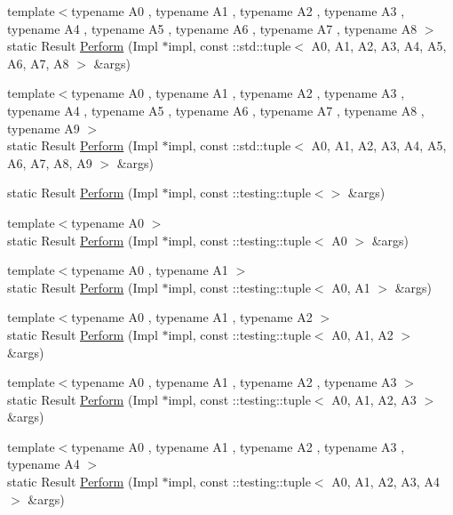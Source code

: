 \begin{DoxyCompactItemize}
\item 
{\footnotesize template$<$typename A0 , typename A1 , typename A2 , typename A3 , typename A4 , typename A5 , typename A6 , typename A7 , typename A8 $>$ }\\static Result \mbox{\hyperlink{classtesting_1_1internal_1_1_action_helper_a4ef8d66e853868f2b29ce6cd7ed84ee1}{Perform}} (Impl $\ast$impl, const \+::std\+::tuple$<$ A0, A1, A2, A3, A4, A5, A6, A7, A8 $>$ \&args)
\item 
{\footnotesize template$<$typename A0 , typename A1 , typename A2 , typename A3 , typename A4 , typename A5 , typename A6 , typename A7 , typename A8 , typename A9 $>$ }\\static Result \mbox{\hyperlink{classtesting_1_1internal_1_1_action_helper_af746a8fa9d26f9eb72a7ea34e939c866}{Perform}} (Impl $\ast$impl, const \+::std\+::tuple$<$ A0, A1, A2, A3, A4, A5, A6, A7, A8, A9 $>$ \&args)
\item 
static Result \mbox{\hyperlink{classtesting_1_1internal_1_1_action_helper_a25176836b0a381d883d61c3a2dc60662}{Perform}} (Impl $\ast$impl, const \+::testing\+::tuple$<$$>$ \&args)
\item 
{\footnotesize template$<$typename A0 $>$ }\\static Result \mbox{\hyperlink{classtesting_1_1internal_1_1_action_helper_a08d2e199b0a3a1f9e05982cae07db3ec}{Perform}} (Impl $\ast$impl, const \+::testing\+::tuple$<$ A0 $>$ \&args)
\item 
{\footnotesize template$<$typename A0 , typename A1 $>$ }\\static Result \mbox{\hyperlink{classtesting_1_1internal_1_1_action_helper_a96d8d8399ff3322e77ba1de51c166f4e}{Perform}} (Impl $\ast$impl, const \+::testing\+::tuple$<$ A0, A1 $>$ \&args)
\item 
{\footnotesize template$<$typename A0 , typename A1 , typename A2 $>$ }\\static Result \mbox{\hyperlink{classtesting_1_1internal_1_1_action_helper_ad450478d185cbcac0e1383f7517f5c36}{Perform}} (Impl $\ast$impl, const \+::testing\+::tuple$<$ A0, A1, A2 $>$ \&args)
\item 
{\footnotesize template$<$typename A0 , typename A1 , typename A2 , typename A3 $>$ }\\static Result \mbox{\hyperlink{classtesting_1_1internal_1_1_action_helper_a2ceda08aeb7b9fd1ad6ccb0821a3ea39}{Perform}} (Impl $\ast$impl, const \+::testing\+::tuple$<$ A0, A1, A2, A3 $>$ \&args)
\item 
{\footnotesize template$<$typename A0 , typename A1 , typename A2 , typename A3 , typename A4 $>$ }\\static Result \mbox{\hyperlink{classtesting_1_1internal_1_1_action_helper_afd2d1dcea480db63416fc3b8604dec56}{Perform}} (Impl $\ast$impl, const \+::testing\+::tuple$<$ A0, A1, A2, A3, A4 $>$ \&args)
$$
\end{DoxyCompactItemize}
